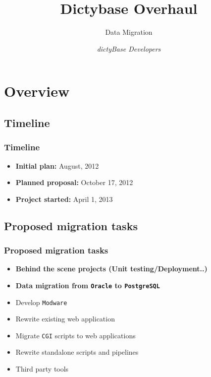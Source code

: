 \documentclass[hyperref={pdfpagelabels=false}, compress]{beamer}
\title{\textbf{Dictybase Overhaul}}
\subtitle{Data Migration}
\author{\textit{dictyBase Developers}}
\begin{document}
\frame{\titlepage}



\section{Overview}

\subsection{Timeline}
 \begin{frame}
 \frametitle{Timeline}
   \begin{itemize}
   
      \item  \textbf{Initial plan:} August, 2012
      \item \textbf{Planned proposal:} October 17, 2012
      \item \textbf{Project started:} April 1, 2013
      
   \end{itemize}
  \end{frame}

\subsection{Proposed migration tasks}
\begin{frame}
	\frametitle{Proposed migration tasks}
	
    	\begin{itemize}
    	\item \textbf{Behind the scene projects (Unit testing/Deployment..)}
		\item \textbf{Data migration from \texttt{Oracle} to \texttt{PostgreSQL}}
		\vspace{0.5cm}
    		\item Develop \texttt{Modware}
    		\item Rewrite existing web application
    		\item Migrate \texttt{CGI} scripts to web applications 
    		\item Rewrite standalone scripts and pipelines
    		\item Third party tools
	\end{itemize}
\end{frame}
\end{document}
